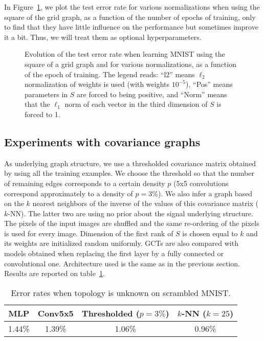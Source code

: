 In Figure~\ref{functionofepoch}, we plot the test error rate for various normalizations when using the square of the grid graph, as a function of the number of epochs of training, only to find that they have little influence on the performance but sometimes improve it a bit. Thus, we will treat them as optional hyperparameters.

\begin{figure}[H]
  \begin{center}
    
  \end{center}
  \caption{Evolution of the test error rate when learning MNIST using the square of a grid graph and for various normalizations, as a function of the epoch of training. The legend reads: ``l2'' means $\ell_2$ normalization of weights is used (with weights $10^{-5}$), ``Pos'' means parameters in $S$ are forced to being positive, and ``Norm'' means that the $\ell_1$ norm of each vector in the third dimension of $S$ is forced to 1.}
  \label{functionofepoch}
\end{figure}

\subsection{Experiments with covariance graphs}

As underlying graph structure, we use a thresholded covariance matrix obtained by using all the training examples. We choose the threshold so that the number of remaining edges corresponds to a certain density $p$ (5x5 convolutions correspond approximately to a density of $p=3\%$). We also infer a graph based on the $k$ nearest neighbors of the inverse of the values of this covariance matrix ($k$-NN). The latter two are using no prior about the signal underlying structure. The pixels of the input images are shuffled and the same re-ordering of the pixels is used for every image. Dimension of the first rank of $S$ is chosen equal to $k$ and its weights are initialized random uniformly.
GCTs are also compared with models obtained when replacing the first layer by a fully connected or convolutional one. Architecture used is the same as in the previous section. Results are reported on table~\ref{covar}.

\begin{table}[H]
  \caption{Error rates when topology is unknown on scrambled MNIST.}
  \begin{center}
    \bgroup
    \def\arraystretch{1.5}%
    \begin{tabular}{|c|c|c|c|}
      \hline
      MLP & Conv5x5 & Thresholded ($p=3\%$) & $k$-NN ($k=25$)\\
      \hline
      1.44\% & 1.39\% & 1.06\% & 0.96\%\\
      \hline
    \end{tabular}
    \egroup
  \end{center}
  \label{covar}
  \end{table}

